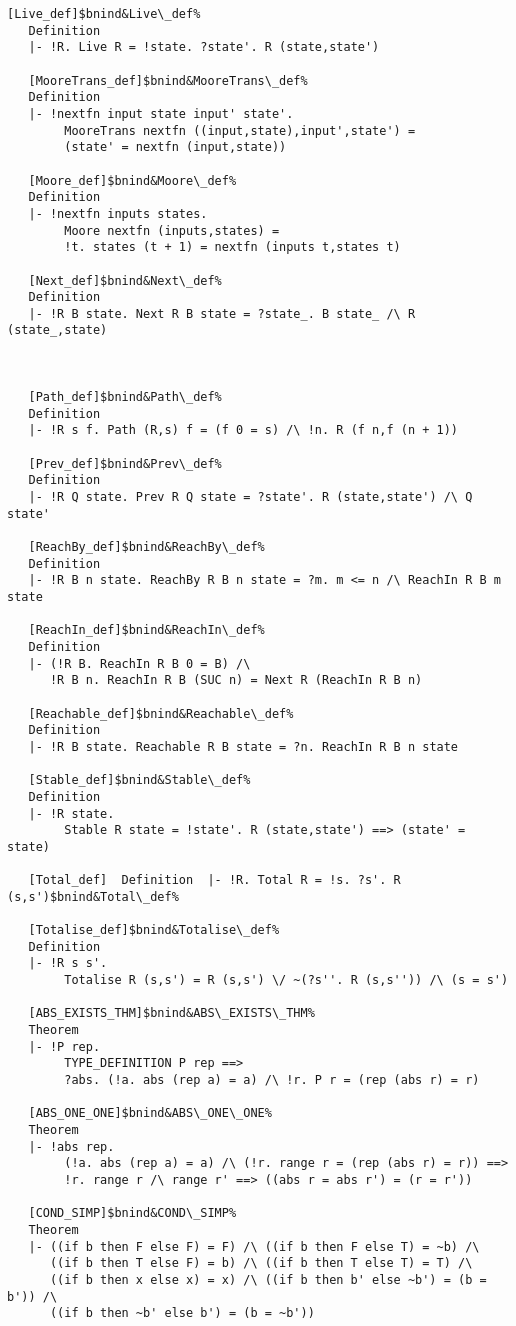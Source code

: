 \documentclass[12pt]{article}
\begin{document}
\begin{footnotesize}
\begin{Verbatim}[commandchars=\$\&\%]
   [Live_def]$bnind&Live\_def%
   Definition
   |- !R. Live R = !state. ?state'. R (state,state')
   
   [MooreTrans_def]$bnind&MooreTrans\_def%
   Definition
   |- !nextfn input state input' state'.
        MooreTrans nextfn ((input,state),input',state') =
        (state' = nextfn (input,state))
   
   [Moore_def]$bnind&Moore\_def%
   Definition
   |- !nextfn inputs states.
        Moore nextfn (inputs,states) =
        !t. states (t + 1) = nextfn (inputs t,states t)
   
   [Next_def]$bnind&Next\_def%
   Definition
   |- !R B state. Next R B state = ?state_. B state_ /\ R (state_,state)
   


   [Path_def]$bnind&Path\_def%
   Definition
   |- !R s f. Path (R,s) f = (f 0 = s) /\ !n. R (f n,f (n + 1))
   
   [Prev_def]$bnind&Prev\_def%
   Definition
   |- !R Q state. Prev R Q state = ?state'. R (state,state') /\ Q state'
   
   [ReachBy_def]$bnind&ReachBy\_def%
   Definition
   |- !R B n state. ReachBy R B n state = ?m. m <= n /\ ReachIn R B m state
   
   [ReachIn_def]$bnind&ReachIn\_def%
   Definition
   |- (!R B. ReachIn R B 0 = B) /\
      !R B n. ReachIn R B (SUC n) = Next R (ReachIn R B n)
   
   [Reachable_def]$bnind&Reachable\_def%
   Definition
   |- !R B state. Reachable R B state = ?n. ReachIn R B n state
   
   [Stable_def]$bnind&Stable\_def%
   Definition
   |- !R state.
        Stable R state = !state'. R (state,state') ==> (state' = state)
   
   [Total_def]  Definition  |- !R. Total R = !s. ?s'. R (s,s')$bnind&Total\_def%
   
   [Totalise_def]$bnind&Totalise\_def%
   Definition
   |- !R s s'.
        Totalise R (s,s') = R (s,s') \/ ~(?s''. R (s,s'')) /\ (s = s')
   
   [ABS_EXISTS_THM]$bnind&ABS\_EXISTS\_THM%
   Theorem
   |- !P rep.
        TYPE_DEFINITION P rep ==>
        ?abs. (!a. abs (rep a) = a) /\ !r. P r = (rep (abs r) = r)
   
   [ABS_ONE_ONE]$bnind&ABS\_ONE\_ONE%
   Theorem
   |- !abs rep.
        (!a. abs (rep a) = a) /\ (!r. range r = (rep (abs r) = r)) ==>
        !r. range r /\ range r' ==> ((abs r = abs r') = (r = r'))
   
   [COND_SIMP]$bnind&COND\_SIMP%
   Theorem
   |- ((if b then F else F) = F) /\ ((if b then F else T) = ~b) /\
      ((if b then T else F) = b) /\ ((if b then T else T) = T) /\
      ((if b then x else x) = x) /\ ((if b then b' else ~b') = (b = b')) /\
      ((if b then ~b' else b') = (b = ~b'))
   

\end{Verbatim}
\end{footnotesize}
\end{document}
